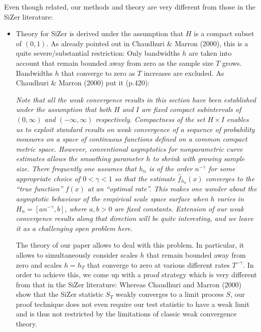 \documentclass[a4paper,12pt]{article}
\begin{document}
Even though related, our methods and theory are very different from those in the SiZer literature:
\begin{itemize}[leftmargin=0.5cm]

\item Theory for SiZer is derived under the assumption that $H$ is a compact subset of $(0,1)$. As already pointed out in Chaudhuri \& Marron (2000), this is a quite severe/substantial restriction: Only bandwidths $h$ are taken into account that remain bounded away from zero as the sample size $T$ grows. Bandwidths $h$ that converge to zero as $T$ increases are excluded. As Chaudhuri \& Marron (2000) put it (p.420): 
\vspace{-0.4cm}

\begin{spacing}{1.0}
{\small \textit{Note that all the weak convergence results in this section have been established under the assumption that both $H$ and $I$ are fixed compact subintervals of $(0,\infty)$ and $(-\infty,\infty)$ respectively. Compactness of the set $H \times I$ enables us to exploit standard results on weak convergence of a sequence of probability measures on a space of continuous functions defined on a common compact metric space. However, conventional asymptotics for nonparametric curve estimates allows the smoothing parameter $h$ to shrink with growing sample size. There frequently one assumes that $h_n$ is of the order $n^{-\gamma}$ for some appropriate choice of $0 < \gamma < 1$ so that the estimate $\hat{f}_{h_n}(x)$ converges to the ``true function'' $f(x)$ at an ``optimal rate''. This makes one wonder about the asymptotic behaviour of the empirical scale space surface when $h$ varies in $H_n = [a n^{-\gamma},b]$, where $a,b > 0$ are fixed constants. Extension of our weak convergence results along that direction will be quite interesting, and we leave it as a challenging open problem here.} }
\end{spacing} 
\vspace{0.2cm}

The theory of our paper allows to deal with this problem. In particular, it allows to simultaneously consider scales $h$ that remain bounded away from zero and scales $h = h_T$ that converge to zero at various different rates $T^{-\gamma}$. In order to achieve this, we come up with a proof strategy which is very different from that in the SiZer literature: Whereas Chaudhuri and Marron (2000) show that the SiZer statistic $S_T$ weakly converges to a limit process $S$, our proof technique does not even require our test statistic to have a weak limit and is thus not restricted by the limitations of classic weak convergence theory. 


\end{itemize}
\end{document}
